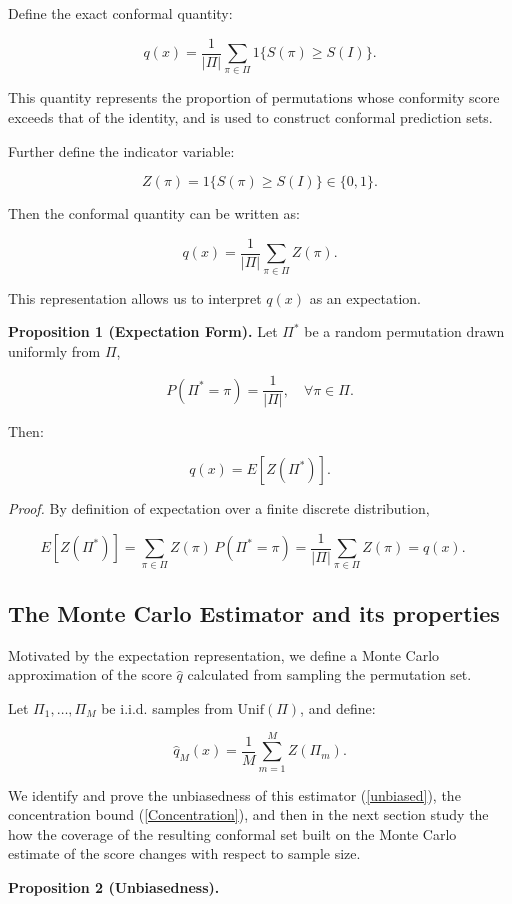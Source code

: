 \documentclass{article}
\begin{document}
Define the exact conformal quantity:

\[
q(x) = \frac{1}{|\Pi|} \sum_{\pi \in \Pi} 1\{S(\pi) \ge S(I)\}.
\]

This quantity represents the proportion of permutations whose conformity score exceeds that of the identity, and is used to construct conformal prediction sets.

Further define the indicator variable:

\[
Z(\pi) = 1\{S(\pi) \ge S(I)\} \in \{0,1\}.
\]

Then the conformal quantity can be written as:

\[
q(x) = \frac{1}{|\Pi|} \sum_{\pi \in \Pi} Z(\pi).
\]

This representation allows us to interpret $q(x)$ as an expectation.

\textbf{Proposition 1 (Expectation Form).}
Let $\Pi^*$ be a random permutation drawn uniformly from $\Pi$,

\[
P(\Pi^* = \pi) = \frac{1}{|\Pi|}, \quad \forall \pi \in \Pi.
\]

Then:

\[
q(x) = E[Z(\Pi^*)].
\]

\textit{Proof.}
By definition of expectation over a finite discrete distribution,

\[
E[Z(\Pi^*)]
=
\sum_{\pi \in \Pi} Z(\pi)\, P(\Pi^* = \pi)
=
\frac{1}{|\Pi|} \sum_{\pi \in \Pi} Z(\pi)
=
q(x).
\quad
\]

\subsection{The Monte Carlo Estimator and its properties}

Motivated by the expectation representation, we define a Monte Carlo approximation of the score $\hat{q}$ calculated from sampling the permutation set.

Let $\Pi_1,\ldots,\Pi_M$ be i.i.d. samples from $\mathrm{Unif}(\Pi)$, and define:

\[
\hat{q}_M(x) = \frac{1}{M} \sum_{m=1}^M Z(\Pi_m).
\]

We identify and prove the unbiasedness of this estimator (\ref{unbiased}), the concentration bound (\ref{Concentration}), and then in the next section study the how the coverage of the resulting conformal set built on the Monte Carlo estimate of the score changes with respect to sample size.

\textbf{Proposition 2 (Unbiasedness).}\label{unbiased}
\end{document}
